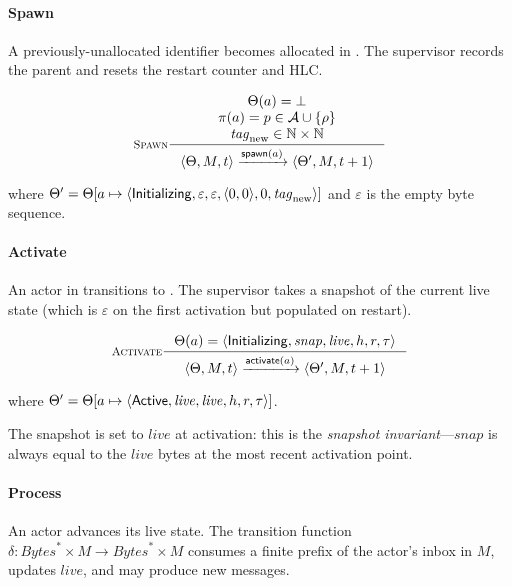 \paragraph{Spawn}
A previously-unallocated identifier becomes allocated in
\Initializing{}.  The supervisor records the parent and resets the
restart counter and HLC.

\begin{equation}
\inference[\textsc{Spawn}]
{
  \Theta(a) = \bot \\
  \pi(a) = p \in \mathcal{A} \cup \{\rho\} \\
  \mathit{tag}_{\mathrm{new}} \in \N \times \N
}
{
  \langle \Theta, M, t\rangle
  \trans{\mathsf{spawn}(a)}
  \langle \Theta', M, t+1\rangle
}
\label{rule:spawn}
\end{equation}

\noindent where
\(\Theta' = \Theta[a \mapsto
  \langle \mathsf{Initializing}{}, \varepsilon, \varepsilon, \langle 0, 0\rangle,
          0, \mathit{tag}_{\mathrm{new}}\rangle]\)
and \(\varepsilon\) is the empty byte sequence.

\paragraph{Activate}
An actor in \Initializing{} transitions to \Active{}.  The
supervisor takes a snapshot of the current live state (which is
\(\varepsilon\) on the first activation but populated on restart).

\begin{equation}
\inference[\textsc{Activate}]
{
  \Theta(a) = \langle \Initializing{}, \mathit{snap}, \mathit{live},
                       h, r, \tau\rangle
}
{
  \langle \Theta, M, t\rangle
  \trans{\mathsf{activate}(a)}
  \langle \Theta', M, t+1\rangle
}
\label{rule:activate}
\end{equation}

\noindent where
\(\Theta' = \Theta[a \mapsto
  \langle \mathsf{Active}{}, \mathit{live}, \mathit{live}, h, r, \tau\rangle]\).

The snapshot is set to \(\mathit{live}\) at activation: this is the
\emph{snapshot invariant}—\(\mathit{snap}\) is always equal to the
\(\mathit{live}\) bytes at the most recent activation point.

\paragraph{Process}
An \Active{} actor advances its live state.  The transition
function \(\delta : \mathit{Bytes}^* \times M \to
\mathit{Bytes}^* \times M\) consumes a finite prefix of the actor's
inbox in \(M\), updates \(\mathit{live}\), and may produce new
messages.

